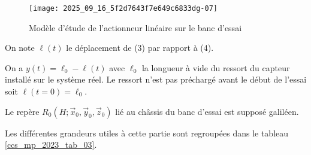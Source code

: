 \begin{figure}[!h]
\centering
\texttt{[image: 2025\_09\_16\_5f2d7643f7e649c6833dg-07]}
\caption{\label{ccs_mp_2023_fig_10}  Modèle d'étude de l'actionneur linéaire sur le banc d'essai}
\end{figure}



On note $\ell(t)$ le déplacement de (3) par rapport à (4).

On a $y(t)=\ell_{0}-\ell(t)$ avec $\ell_{0}$ la longueur à vide du ressort du capteur installé sur le système réel. Le ressort n'est pas préchargé avant le début de l'essai soit $\ell(t=0)=\ell_{0}$.

Le repère $R_{0}\left(H ; \vec{x}_{0}, \vec{y}_{0}, \vec{z}_{0}\right)$ lié au châssis du banc d'essai est supposé galiléen.

Les différentes grandeurs utiles à cette partie sont regroupées dans le tableau \ref{ccs_mp_2023_tab_03}.

